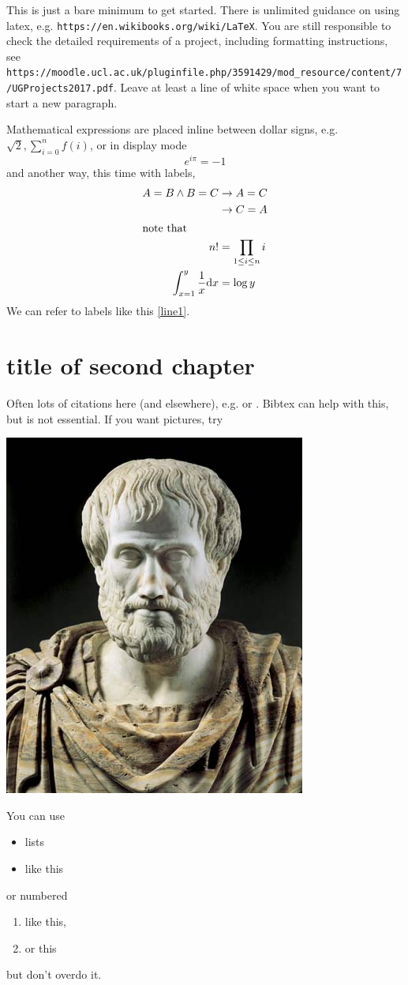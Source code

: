 \documentclass[12pt]{report}
\begin{document}
This is just a bare minimum to get started.  There is unlimited guidance on using latex, e.g. {\tt https://en.wikibooks.org/wiki/LaTeX}.   You are still responsible to check the detailed requirements of a project, including formatting instructions, see \\
{\tt https://moodle.ucl.ac.uk/pluginfile.php/3591429/mod\_resource/content/7/UGProjects2017.pdf}.
Leave at least a line of white space when you want to start a new paragraph.

Mathematical expressions are placed inline between dollar signs, e.g. $\sqrt 2, \sum_{i=0}^nf(i)$, or in display mode
\[ e^{i\pi}=-1\] and another way, this time with labels,
\begin{align}
\label{line1} A=B\wedge B=C&\rightarrow A=C\\
&\rightarrow C=A\\
\intertext{note that}
n!&=\prod_{1\leq i\leq n}i \\
\int_{x=1}^y \frac 1 x \mathrm{d}x&=\log y
\end{align}
We can refer to labels like this \eqref{line1}.   

\chapter{title of second chapter}
Often lots of citations here (and elsewhere), e.g. \cite{Rey:D} or \cite[Theorem 2.3]{PriorNOP70}.   Bibtex can help with this, but is not essential. If you want pictures, try

\begin{center}
\includegraphics[scale=.5]{aristotle.jpg}
\end{center}
You can use 
\begin{itemize}
\item lists
\item like this
\end{itemize}
or numbered
\begin{enumerate}
\item like this,
\item or this
\end{enumerate}
but don't overdo it.
\end{document}
